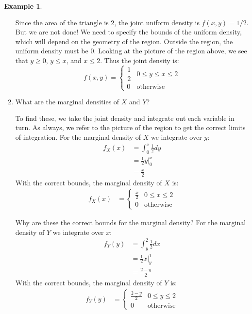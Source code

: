 \documentclass[12pt]{article}
\theoremstyle{definition}
\newtheorem*{example}{Example}
\theoremstyle{remark}
\begin{document}
\begin{example}
\begin{enumerate}
Since the area of the triangle is 2, the joint uniform density is $f(x, y) = 1/2$. But we are not done! We need to specify the bounds of the uniform density, which will depend on the geometry of the region. Outside the region, the uniform density must be 0. Looking at the picture of the region above, we see that $y \geq 0$, $y \leq x$, and $x \leq 2$. Thus the joint density is:
\[
f(x, y) = \begin{cases} 
      \dfrac{1}{2}  & 0 \leq y \leq x \leq 2 \\
      0 & \textrm{otherwise}
   \end{cases}
\]

\item What are the marginal densities of $X$ and $Y$?

To find these, we take the joint density and integrate out each variable in turn. As always, we refer to the picture of the region to get the correct limits of integration. For the marginal density of $X$ we integrate over $y$:
\begin{align*}
f_X(x) &= \int_0^x \frac{1}{2} dy \\
&= \frac{1}{2} y\Bigr|_0^x \\
&= \frac{x}{2}
\end{align*}
With the correct bounds, the marginal density of $X$ is:
\begin{align*}
f_X(x) &= \begin{cases}
  \frac{x}{2} & 0 \leq x \leq 2 \\
  0 & \textrm{otherwise}
   \end{cases}
\end{align*}

Why are these the correct bounds for the marginal density? For the marginal density of $Y$ we integrate over $x$:
\begin{align*}
f_Y(y) &= \int_y^2 \frac{1}{2} dx \\
&= \frac{1}{2} x\Bigr|_y^1 \\
&= \frac{2 - y}{2}
\end{align*}
With the correct bounds, the marginal density of $Y$ is:
\begin{align*}
f_Y(y) &= \begin{cases}
 \frac{2 - y}{2} & 0 \leq y \leq 2 \\
  0 & \textrm{otherwise}
   \end{cases}
\end{align*}

\end{enumerate}
\end{example}
\end{document}
